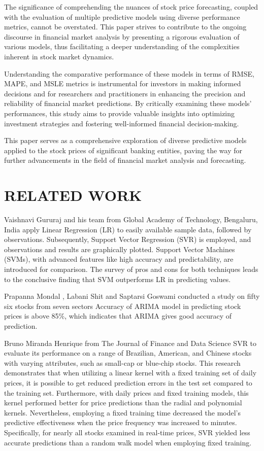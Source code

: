 \documentclass{ieeeojies}
\begin{document}
The significance of comprehending the nuances of stock price forecasting, coupled with the evaluation of multiple predictive models using diverse performance metrics, cannot be overstated. This paper strives to contribute to the ongoing discourse in financial market analysis by presenting a rigorous evaluation of various models, thus facilitating a deeper understanding of the complexities inherent in stock market dynamics.

Understanding the comparative performance of these models in terms of RMSE, MAPE, and MSLE metrics is instrumental for investors in making informed decisions and for researchers and practitioners in enhancing the precision and reliability of financial market predictions. By critically examining these models' performances, this study aims to provide valuable insights into optimizing investment strategies and fostering well-informed financial decision-making.

This paper serves as a comprehensive exploration of diverse predictive models applied to the stock prices of significant banking entities, paving the way for further advancements in the field of financial market analysis and forecasting.


\section{RELATED WORK}
\hspace{1em}Vaishnavi Gururaj and his team from Global Academy of Technology, Bengaluru, India apply Linear Regression (LR) to easily available sample data, followed by observations. Subsequently, Support Vector Regression (SVR) is employed, and observations and results are graphically plotted. Support Vector Machines (SVMs), with advanced features like high accuracy and predictability, are introduced for comparison. The survey of pros and cons for both techniques leads to the conclusive finding that SVM outperforms LR in predicting values.\cite{a1}

Prapanna Mondal , Labani Shit and Saptarsi Goswami conducted a study on fifty six stocks from seven sectors Accuracy of ARIMA model in predicting stock prices is above 85\%, which indicates that ARIMA gives good accuracy of prediction.\cite{a2}

Bruno Miranda Henrique from The Journal of Finance and Data Science SVR to evaluate its performance on a range of Brazilian, American, and Chinese stocks with varying attributes, such as small-cap or blue-chip stocks. This research demonstrates that when utilizing a linear kernel with a fixed training set of daily prices, it is possible to get reduced prediction errors in the test set compared to the training set. Furthermore, with daily prices and fixed training models, this kernel performed better for price predictions than the radial and polynomial kernels. Nevertheless, employing a fixed training time decreased the model's predictive effectiveness when the price frequency was increased to minutes. Specifically, for nearly all stocks examined in real-time prices, SVR yielded less accurate predictions than a random walk model when employing fixed training.\cite{a3}
\end{document}
